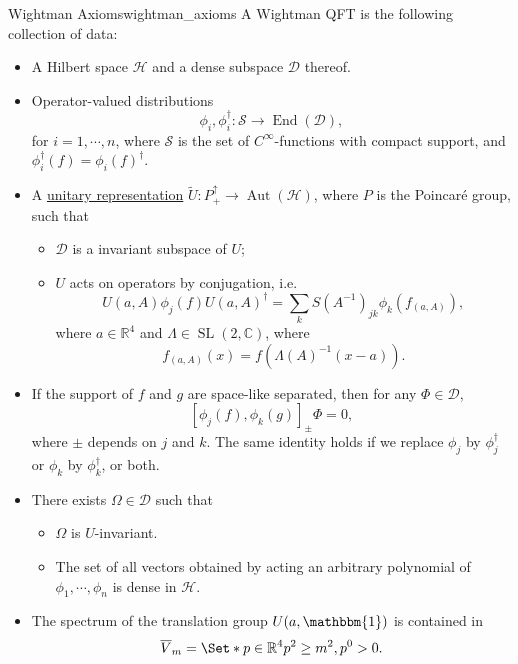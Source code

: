 \documentclass{article}
\begin{document}
\begin{definition}{Wightman Axioms}{wightman_axioms}
    A Wightman QFT is the following collection of data: \cite{Araki_Huzihiro2009-07-05}
    \begin{itemize}
        \item A Hilbert space $\mathcal{H}$ and a dense subspace $\mathcal{D}$ thereof.
        \item Operator-valued distributions
        \[ \phi_i, \phi_i^\dagger: \mathcal{S} \rightarrow \operatorname{End}(\mathcal{D}), \]
        for $i = 1,\cdots, n$, where $\mathcal{S}$ is the set of $C^\infty$-functions with compact support, and $\phi_i^\dagger(f) = \phi_i(f)^\dagger$.
        \item A \hyperref[Repr-def:unitary_representation]{unitary representation} $\tilde{U}: P^{\uparrow}_+\rightarrow \operatorname{Aut}(\mathcal{H})$, where $P$ is the Poincar\'e group, such that
        \begin{itemize}
            \item $\mathcal{D}$ is a invariant subspace of $U$;
            \item $U$ acts on operators by conjugation, i.e.
            \[ U(a, A) \phi_j(f) U(a, A)^\dagger = \sum_k S(A^{-1})_{jk} \phi_k(f_{(a, A)}), \]
            where $a\in \mathbb{R}^4$ and $\Lambda\in \operatorname{SL}(2,\mathbb{C})$, where
            \[ f_{(a,A)}(x) = f(\Lambda(A)^{-1}(x-a)). \]
        \end{itemize}
        \item If the support of $f$ and $g$ are space-like separated, then for any $\Phi \in \mathcal{D}$,
        \[ [\phi_j(f), \phi_k(g)]_\pm \Phi = 0, \]
        where $\pm$ depends on $j$ and $k$. The same identity holds if we replace $\phi_j$ by $\phi_j^\dagger$ or $\phi_k$ by $\phi_k^\dagger$, or both.
        \item There exists $\Omega \in \mathcal{D}$ such that
        \begin{itemize}
            \item $\Omega$ is $U$-invariant.
            \item The set of all vectors obtained by acting an arbitrary polynomial of $\phi_1,\cdots,\phi_n$ is dense in $\mathcal{H}$.
        \end{itemize}
        \item The spectrum of the translation group $U(a,\mathbbm{1})$ is contained in
        \[ \overline{V}_m = \Set*{p\in \mathbb{R}^4}{p^2 \ge m^2, p^0 > 0}. \]
    \end{itemize}
\end{definition}
\end{document}
